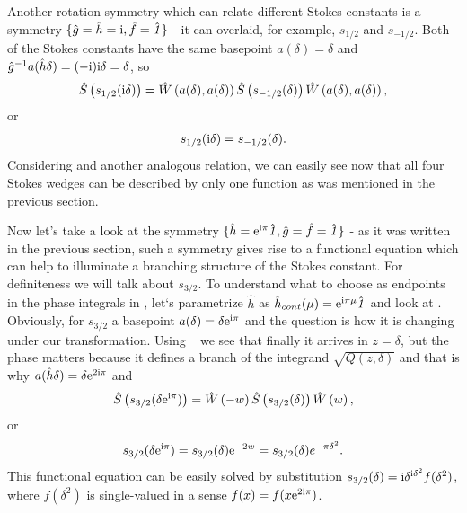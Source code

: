 \documentclass[12pt]{iopart}
\def\S{\hat{S}}
\def\W{\hat{W}}
\def\f{\hat{f}}
\def\g{\hat{g}}
\def\h{\hat{h}}
\def\unity{\hat{\it 1}}
\begin{document}
Another rotation symmetry which can relate different Stokes constants is a symmetry 
$\{\g=\h=\rmi,\f=\unity\}$ - it can overlaid, for example, 
$s_{1/2}$ and $s_{-1/2}$. Both of the Stokes constants have the same basepoint $a(\delta)=\delta$ 
and $\g^{-1}a(\h\delta)=(-\rmi)\rmi\delta=\delta$, so
\begin{eqnarray}
\S \left( s_{1/2}(\rmi \delta) \right) = 
\W \left( a(\delta), a(\delta) \right)
\S \left( s_{-1/2}(\delta) \right)
\W \left( a(\delta), a(\delta) \right),
\end{eqnarray}
or
\begin{eqnarray}
s_{1/2}(\mathrm{i} \delta) = s_{-1/2}(\delta).
\label{eq:websym_2}
\end{eqnarray}
Considering  and another analogous relation, we can easily see now that all four Stokes wedges can be described by only one function as was mentioned in the previous section. 

Now let's take a look at the symmetry $\{\h=\rme^{\rmi\pi}\unity,\g=\f=\unity\}$ - as it was written in the previous section, such a symmetry gives rise to a functional equation which can help to illuminate a branching structure of the Stokes constant. 
For definiteness we will talk about $s_{3/2}$. To understand what to choose as endpoints in the phase integrals in , let`s parametrize $\h$ as $\h_{cont}(\mu)=\rme^{\rmi\pi\mu}\unity$ and look at . Obviously, for $s_{3/2}$ a basepoint $a(\delta)=\delta \mathrm{e}^{\mathrm{i}\pi}$ and the question is how it is changing under our transformation. Using ~ we see that finally it arrives in $z=\delta$, but the phase matters because it defines a branch of the integrand $\sqrt{Q(z,\delta)}$ and that is why 
$a(\h\delta)=\delta \rme^{2\rmi\pi}$ and
\begin{eqnarray}
\S \left( s_{3/2}(\delta \rme^{\rmi\pi}) \right) = 
\W \left(-w \right)
\S \left( s_{3/2} (\delta) \right)
\W \left( w \right),
\end{eqnarray}
or
\begin{eqnarray}
s_{3/2}(\delta \mathrm{e}^{\mathrm{i}\pi})=s_{3/2}(\delta)\mathrm{e}^{-2w}=s_{3/2}(\delta)e^{-\pi\delta^2}.
\label{eq:websym_3}
\end{eqnarray}
This functional equation can be easily solved by substitution 
$s_{3/2}(\delta)=\mathrm{i}\delta^{\mathrm{i}\delta^2}f(\delta^2)$, where $f(\delta^2)$
is single-valued in a sense $f(x)=f(x \mathrm{e}^{2\mathrm{i}\pi})$.
\end{document}
